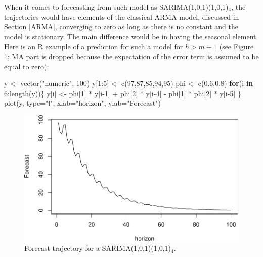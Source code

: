 \documentclass[
]{book}
\newenvironment{Shaded}{\begin{snugshade}}{\end{snugshade}}
\newcommand{\AttributeTok}[1]{\textcolor[rgb]{0.77,0.63,0.00}{#1}}
\newcommand{\ControlFlowTok}[1]{\textcolor[rgb]{0.13,0.29,0.53}{\textbf{#1}}}
\newcommand{\DecValTok}[1]{\textcolor[rgb]{0.00,0.00,0.81}{#1}}
\newcommand{\FloatTok}[1]{\textcolor[rgb]{0.00,0.00,0.81}{#1}}
\newcommand{\FunctionTok}[1]{\textcolor[rgb]{0.00,0.00,0.00}{#1}}
\newcommand{\NormalTok}[1]{#1}
\newcommand{\OtherTok}[1]{\textcolor[rgb]{0.56,0.35,0.01}{#1}}
\newcommand{\SpecialCharTok}[1]{\textcolor[rgb]{0.00,0.00,0.00}{#1}}
\newcommand{\StringTok}[1]{\textcolor[rgb]{0.31,0.60,0.02}{#1}}
\theoremstyle{definition}
\theoremstyle{definition}
\theoremstyle{definition}
\theoremstyle{definition}
\theoremstyle{remark}
\begin{document}
When it comes to forecasting from such model as SARIMA(1,0,1)(1,0,1)\(_4\), the trajectories would have elements of the classical ARMA model, discussed in Section \ref{ARMA}, converging to zero as long as there is no constant and the model is stationary. The main difference would be in having the seasonal element. Here is an R example of a prediction for such a model for \(h>m+1\) (see Figure \ref{fig:SARIMATrajectory}; MA part is dropped because the expectation of the error term is assumed to be equal to zero):

\begin{Shaded}
\begin{Highlighting}[]
\NormalTok{y }\OtherTok{\textless{}{-}} \FunctionTok{vector}\NormalTok{(}\StringTok{"numeric"}\NormalTok{, }\DecValTok{100}\NormalTok{)}
\NormalTok{y[}\DecValTok{1}\SpecialCharTok{:}\DecValTok{5}\NormalTok{] }\OtherTok{\textless{}{-}} \FunctionTok{c}\NormalTok{(}\DecValTok{97}\NormalTok{,}\DecValTok{87}\NormalTok{,}\DecValTok{85}\NormalTok{,}\DecValTok{94}\NormalTok{,}\DecValTok{95}\NormalTok{)}
\NormalTok{phi }\OtherTok{\textless{}{-}} \FunctionTok{c}\NormalTok{(}\FloatTok{0.6}\NormalTok{,}\FloatTok{0.8}\NormalTok{)}
\ControlFlowTok{for}\NormalTok{(i }\ControlFlowTok{in} \DecValTok{6}\SpecialCharTok{:}\FunctionTok{length}\NormalTok{(y))\{}
\NormalTok{    y[i] }\OtherTok{\textless{}{-}}\NormalTok{ phi[}\DecValTok{1}\NormalTok{] }\SpecialCharTok{*}\NormalTok{ y[i}\DecValTok{{-}1}\NormalTok{] }\SpecialCharTok{+}\NormalTok{ phi[}\DecValTok{2}\NormalTok{] }\SpecialCharTok{*}\NormalTok{ y[i}\DecValTok{{-}4}\NormalTok{] }\SpecialCharTok{{-}}
\NormalTok{      phi[}\DecValTok{1}\NormalTok{] }\SpecialCharTok{*}\NormalTok{ phi[}\DecValTok{2}\NormalTok{] }\SpecialCharTok{*}\NormalTok{ y[i}\DecValTok{{-}5}\NormalTok{]}
\NormalTok{\}}
\FunctionTok{plot}\NormalTok{(y, }\AttributeTok{type=}\StringTok{"l"}\NormalTok{, }\AttributeTok{xlab=}\StringTok{"horizon"}\NormalTok{, }\AttributeTok{ylab=}\StringTok{"Forecast"}\NormalTok{)}
\end{Highlighting}
\end{Shaded}

\begin{figure}
\centering
\includegraphics{Svetunkov--2022----ADAM_files/figure-latex/SARIMATrajectory-1.pdf}
\caption{\label{fig:SARIMATrajectory}Forecast trajectory for a SARIMA(1,0,1)(1,0,1)\(_4\).}
\end{figure}
\end{document}
